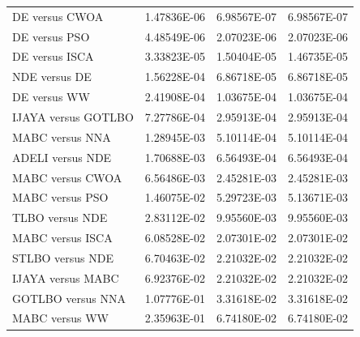 \documentclass[a4paper,fleqn]{cas-dc}
\begin{document}
\begin{table}[<options>]
\begin{tabular*}{\tblwidth}{@{}LCCC@{}}
DE versus CWOA&1.47836E-06&6.98567E-07&6.98567E-07\\
DE versus PSO&4.48549E-06&2.07023E-06&2.07023E-06\\
DE versus ISCA&3.33823E-05&1.50404E-05&1.46735E-05\\
NDE versus DE&1.56228E-04&6.86718E-05&6.86718E-05\\
DE versus WW&2.41908E-04&1.03675E-04&1.03675E-04\\
IJAYA versus GOTLBO&7.27786E-04&2.95913E-04&2.95913E-04\\
MABC versus NNA&1.28945E-03&5.10114E-04&5.10114E-04\\
ADELI versus NDE&1.70688E-03&6.56493E-04&6.56493E-04\\
MABC versus CWOA&6.56486E-03&2.45281E-03&2.45281E-03\\
MABC versus PSO&1.46075E-02&5.29723E-03&5.13671E-03\\
TLBO versus NDE&2.83112E-02&9.95560E-03&9.95560E-03\\
MABC versus ISCA&6.08528E-02&2.07301E-02&2.07301E-02\\
STLBO versus NDE&6.70463E-02&2.21032E-02&2.21032E-02\\
IJAYA versus MABC&6.92376E-02&2.21032E-02&2.21032E-02\\
GOTLBO versus NNA&1.07776E-01&3.31618E-02&3.31618E-02\\
MABC versus WW&2.35963E-01&6.74180E-02&6.74180E-02\\
\bottomrule
\end{tabular*}
\end{table}
\end{document}
